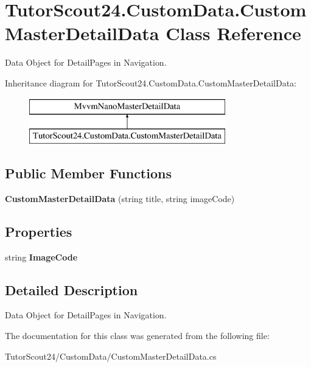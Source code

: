 \hypertarget{class_tutor_scout24_1_1_custom_data_1_1_custom_master_detail_data}{}\section{Tutor\+Scout24.\+Custom\+Data.\+Custom\+Master\+Detail\+Data Class Reference}
\label{class_tutor_scout24_1_1_custom_data_1_1_custom_master_detail_data}


Data Object for Detail\+Pages in Navigation.  


Inheritance diagram for Tutor\+Scout24.\+Custom\+Data.\+Custom\+Master\+Detail\+Data\+:\begin{figure}[H]
\begin{center}
\leavevmode
\includegraphics[height=2.000000cm]{class_tutor_scout24_1_1_custom_data_1_1_custom_master_detail_data}
\end{center}
\end{figure}
\subsection*{Public Member Functions}
\begin{DoxyCompactItemize}
\item 
\mbox{\label{class_tutor_scout24_1_1_custom_data_1_1_custom_master_detail_data_a71375e11da1c3d849c986fce2a9e4b15}} 
{\bfseries Custom\+Master\+Detail\+Data} (string title, string image\+Code)
\end{DoxyCompactItemize}
\subsection*{Properties}
\begin{DoxyCompactItemize}
\item 
\mbox{\label{class_tutor_scout24_1_1_custom_data_1_1_custom_master_detail_data_a586f1a851663744cf19432fd9f4b7e41}} 
string {\bfseries Image\+Code}
\end{DoxyCompactItemize}


\subsection{Detailed Description}
Data Object for Detail\+Pages in Navigation. 



The documentation for this class was generated from the following file\+:\begin{DoxyCompactItemize}
\item 
Tutor\+Scout24/\+Custom\+Data/Custom\+Master\+Detail\+Data.\+cs\end{DoxyCompactItemize}
